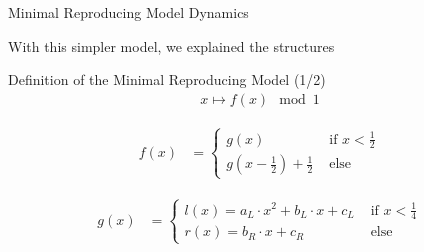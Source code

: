 \begin{frame}{Minimal Reproducing Model Dynamics}
	\vspace{-1em}
	\begin{figure}
		\qquad
	\end{figure}
	With this simpler model, we explained the structures
\end{frame}

\begin{frame}{Definition of the Minimal Reproducing Model (1/2)}
	\vspace{-3.0em}
	\begin{align}
		x \mapsto f(x) \mod 1
	\end{align}

	\begin{align}
		f(x) & = \begin{cases}
			         g(x)                                        & \text{ if } x < \frac{1}{2} \\
			         g\left(x - \frac{1}{2}\right) + \frac{1}{2} & \text{ else}
		         \end{cases}
	\end{align}

	\begin{align}
		g(x) & = \begin{cases}
			         l(x) = a_L \cdot x^2 + b_L \cdot x + c_L & \text{ if } x < \frac{1}{4} \\
			         r(x) = b_R \cdot x + c_R                 & \text{ else}
		         \end{cases}
	\end{align}
\end{frame}

